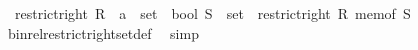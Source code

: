 \begin{isabellebody}
\ \ {\isachardoublequoteopen}restrict{\isacharunderscore}{\kern0pt}right\ {\isacharparenleft}{\kern0pt}R\ {\isacharcolon}{\kern0pt}{\isacharcolon}{\kern0pt}\ {\isacharprime}{\kern0pt}a\ {\isasymRightarrow}\ set\ {\isasymRightarrow}\ bool{\isacharparenright}{\kern0pt}\ {\isacharparenleft}{\kern0pt}S\ {\isacharcolon}{\kern0pt}{\isacharcolon}{\kern0pt}\ set{\isacharparenright}{\kern0pt}\ {\isacharequal}{\kern0pt}\ restrict{\isacharunderscore}{\kern0pt}right\ R\ {\isacharparenleft}{\kern0pt}mem{\isacharunderscore}{\kern0pt}of\ S{\isacharparenright}{\kern0pt}{\isachardoublequoteclose}\isanewline
%
\isadelimproof
\ \ %
\endisadelimproof
%
\isatagproof
{}\isamarkupfalse%
\ bin{\isacharunderscore}{\kern0pt}rel{\isacharunderscore}{\kern0pt}restrict{\isacharunderscore}{\kern0pt}right{\isacharunderscore}{\kern0pt}set{\isacharunderscore}{\kern0pt}def\ \isamarkupfalse%
\ simp%
\endisatagproof
{\isafoldproof}%
%
\isadelimproof
\isanewline
%
\endisadelimproof
\isanewline
%
\isadelimtheory
\isanewline
%
\endisadelimtheory
%
\isatagtheory
{}\isamarkupfalse%
%
\endisatagtheory
{\isafoldtheory}%
%
\isadelimtheory
%
\endisadelimtheory
%
\end{isabellebody}%
\endinput
